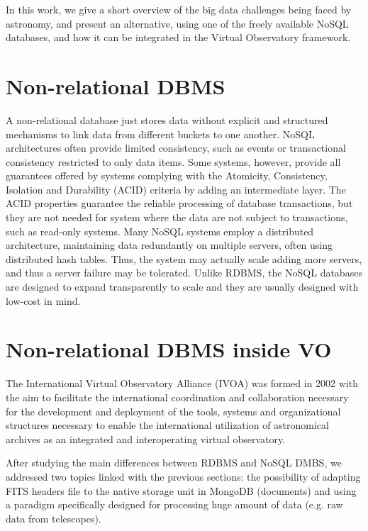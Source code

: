 \documentclass[a4paper,12pt]{article}
\begin{document}
In this work, we give a short overview of the big data challenges being faced by astronomy, and present an alternative, using one of the freely available NoSQL databases, and how it can be integrated in the Virtual Observatory framework.


\section{Non-relational DBMS}

A non-relational database just stores data without explicit and structured mechanisms to link data from different buckets to one another. NoSQL architectures often provide limited consistency, such as events or transactional consistency restricted to only data items. Some systems, however, provide all guarantees offered by systems complying with the Atomicity, Consistency, Isolation and Durability (ACID) criteria
by adding an intermediate layer. The ACID properties guarantee the reliable processing of database transactions, but they are not needed for system where the data are not subject to transactions, such as read-only systems. Many NoSQL systems employ a distributed architecture, maintaining data redundantly on multiple servers, often using distributed hash tables. Thus, the system may actually scale adding more servers, and thus a server failure may be tolerated. Unlike RDBMS, the NoSQL databases are designed to expand transparently to scale and they are usually designed with low-cost in mind.



\section{Non-relational DBMS inside VO}

The International Virtual Observatory Alliance (IVOA) was formed in 2002 with the aim to facilitate the international coordination and collaboration necessary for the development and deployment of the tools, systems and organizational structures necessary to enable the international utilization of astronomical archives as an integrated and interoperating virtual observatory. \newline

After studying the main differences between RDBMS and NoSQL DMBS, we addressed two topics linked with the previous sections: the possibility of adapting FITS headers file to the native storage unit in MongoDB (documents) and using a paradigm specifically designed for processing huge amount of data (e.g. raw data from telescopes). \newline
\end{document}
